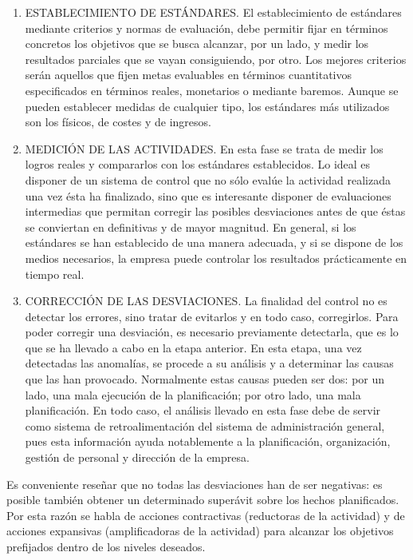 \documentclass[
]{krantz}
\providecommand{\tightlist}{%
  \setlength{\itemsep}{0pt}\setlength{\parskip}{0pt}}
\begin{document}
\begin{enumerate}
\def\labelenumi{\arabic{enumi}.}
\tightlist
\item
  ESTABLECIMIENTO DE ESTÁNDARES. El establecimiento de estándares mediante criterios y normas de evaluación, debe permitir fijar en términos concretos los objetivos que se busca alcanzar, por un lado, y medir los resultados parciales que se vayan consiguiendo, por otro. Los mejores criterios serán aquellos que fijen metas evaluables en términos cuantitativos especificados en términos reales, monetarios o mediante baremos. Aunque se pueden establecer medidas de cualquier tipo, los estándares más utilizados son los físicos, de costes y de ingresos.
\item
  MEDICIÓN DE LAS ACTIVIDADES. En esta fase se trata de medir los logros reales y compararlos con los estándares establecidos. Lo ideal es disponer de un sistema de control que no sólo evalúe la actividad realizada una vez ésta ha finalizado, sino que es interesante disponer de evaluaciones intermedias que permitan corregir las posibles desviaciones antes de que éstas se conviertan en definitivas y de mayor magnitud. En general, si los estándares se han establecido de una manera adecuada, y si se dispone de los medios necesarios, la empresa puede controlar los resultados prácticamente en tiempo real.
\item
  CORRECCIÓN DE LAS DESVIACIONES. La finalidad del control no es detectar los errores, sino tratar de evitarlos y en todo caso, corregirlos. Para poder corregir una desviación, es necesario previamente detectarla, que es lo que se ha llevado a cabo en la etapa anterior. En esta etapa, una vez detectadas las anomalías, se procede a su análisis y a determinar las causas que las han provocado. Normalmente estas causas pueden ser dos: por un lado, una mala ejecución de la planificación; por otro lado, una mala planificación. En todo caso, el análisis llevado en esta fase debe de servir como sistema de retroalimentación del sistema de administración general, pues esta información ayuda notablemente a la planificación, organización, gestión de personal y dirección de la empresa.
\end{enumerate}

Es conveniente reseñar que no todas las desviaciones han de ser negativas: es posible también obtener un determinado superávit sobre los hechos planificados. Por esta razón se habla de acciones contractivas (reductoras de la actividad) y de acciones expansivas (amplificadoras de la actividad) para alcanzar los objetivos prefijados dentro de los niveles deseados.
\end{document}
